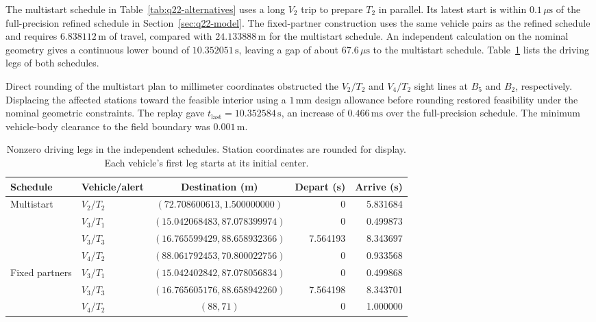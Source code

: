 \documentclass{swmcmthesis}
\begin{document}
The multistart schedule in Table~\ref{tab:q22-alternatives} uses a long \(V_2\) trip to prepare \(T_2\) in parallel. Its latest start is within \(0.1\,\mu\mathrm s\) of the full-precision refined schedule in Section~\ref{sec:q22-model}. The fixed-partner construction uses the same vehicle pairs as the refined schedule and requires \(6.838112\,\mathrm m\) of travel, compared with \(24.133888\,\mathrm m\) for the multistart schedule. An independent calculation on the nominal geometry gives a continuous lower bound of \(10.352051\,\mathrm s\), leaving a gap of about \(67.6\,\mu\mathrm s\) to the multistart schedule. Table~\ref{tab:q22-alternative-legs} lists the driving legs of both schedules.

Direct rounding of the multistart plan to millimeter coordinates obstructed the \(V_2/T_2\) and \(V_4/T_2\) sight lines at \(B_5\) and \(B_2\), respectively. Displacing the affected stations toward the feasible interior using a \(1\,\mathrm{mm}\) design allowance before rounding restored feasibility under the nominal geometric constraints. The replay gave \(t_{\mathrm{last}}=10.352584\,\mathrm s\), an increase of \(0.466\,\mathrm{ms}\) over the full-precision schedule. The minimum vehicle-body clearance to the field boundary was \(0.001\,\mathrm m\).

\begin{table}[!htbp]
    \centering
    \caption{Nonzero driving legs in the independent schedules. Station coordinates are rounded for display. Each vehicle's first leg starts at its initial center.}
    \label{tab:q22-alternative-legs}
    \setlength{\tabcolsep}{4pt}
    \begin{tabular}{@{}llcrr@{}}
        \toprule
        Schedule & Vehicle/alert & Destination (m) & Depart (s) & Arrive (s) \\
        \midrule
        Multistart & \(V_2/T_2\) & \((72.708600613,1.500000000)\) & 0 & 5.831684 \\
                   & \(V_3/T_1\) & \((15.042068483,87.078399974)\) & 0 & 0.499873 \\
                   & \(V_3/T_3\) & \((16.765599429,88.658932366)\) & 7.564193 & 8.343697 \\
                   & \(V_4/T_2\) & \((88.061792453,70.800022756)\) & 0 & 0.933568 \\
        \addlinespace
        Fixed partners & \(V_3/T_1\) & \((15.042402842,87.078056834)\) & 0 & 0.499868 \\
                       & \(V_3/T_3\) & \((16.765605176,88.658942260)\) & 7.564198 & 8.343701 \\
                       & \(V_4/T_2\) & \((88,71)\) & 0 & 1.000000 \\
        \bottomrule
    \end{tabular}
\end{table}
\end{document}
